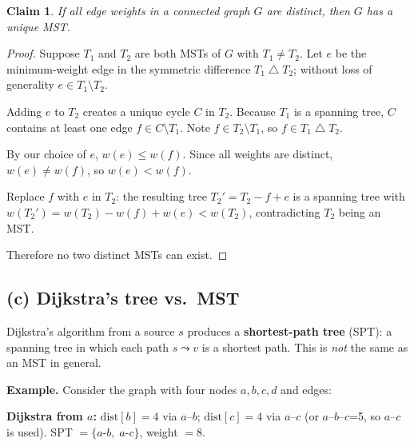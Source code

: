 \documentclass[11pt]{article}
\newtheorem*{claim}{Claim}
\begin{document}
\begin{claim}
If all edge weights in a connected graph $G$ are distinct, then $G$ has a unique MST.
\end{claim}
\begin{proof}
Suppose $T_1$ and $T_2$ are both MSTs of $G$ with $T_1\neq T_2$.  Let $e$ be the minimum-weight edge in the symmetric difference $T_1\mathbin{\triangle}T_2$; without loss of generality $e\in T_1\setminus T_2$.

Adding $e$ to $T_2$ creates a unique cycle $C$ in $T_2$.  Because $T_1$ is a spanning tree, $C$ contains at least one edge $f\in C\setminus T_1$.  Note $f\in T_2\setminus T_1$, so $f\in T_1\mathbin{\triangle}T_2$.

By our choice of $e$, $w(e)\leq w(f)$.  Since all weights are distinct, $w(e)\neq w(f)$, so $w(e)<w(f)$.

Replace $f$ with $e$ in $T_2$: the resulting tree $T_2'=T_2-f+e$ is a spanning tree with $w(T_2')=w(T_2)-w(f)+w(e)<w(T_2)$, contradicting $T_2$ being an MST.

Therefore no two distinct MSTs can exist.
\end{proof}

\subsection*{(c) Dijkstra's tree vs.\ MST}

Dijkstra's algorithm from a source $s$ produces a \textbf{shortest-path tree} (SPT): a spanning tree in which each path $s\leadsto v$ is a shortest path.  This is \emph{not} the same as an MST in general.

\textbf{Example.}  Consider the graph with four nodes $a,b,c,d$ and edges:

\begin{center}
\end{center}

\textbf{Dijkstra from $a$:} $\mathrm{dist}[b]=4$ via $a$--$b$; $\mathrm{dist}[c]=4$ via $a$--$c$ (or $a$--$b$--$c$=5, so $a$--$c$ is used).
SPT $= \{a\text{-}b,\; a\text{-}c\}$, weight $= 8$.
\end{document}
